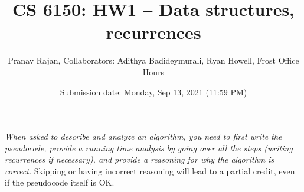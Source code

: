 \documentclass[addpoints, 11pt]{exam}
\title{CS 6150: HW1 -- Data structures, recurrences}
\date{Submission date: Monday, Sep 13, 2021 (11:59 PM)}
\author{Pranav Rajan, Collaborators: Adithya Badideymurali, Ryan Howell, Frost Office Hours}
\begin{document}
\maketitle
\begin{center}
\end{center}

\pointname{}
\bonuspointname{}
\pointformat{[\bfseries\thepoints]}

\begin{center}
  \gradetable
\end{center}
\newpage

 \emph{When asked to describe and analyze an algorithm, you need to first write the pseudocode, provide a running time analysis by going over all the steps (writing recurrences if necessary), and provide a reasoning for why the algorithm is correct.} Skipping or having incorrect reasoning will lead to a partial credit, even if the pseudocode itself is OK.
\end{document}
